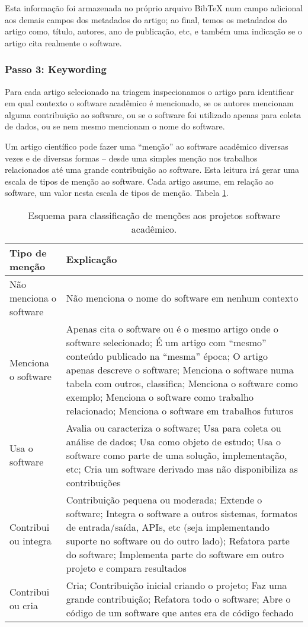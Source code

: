 Esta informação foi armazenada no próprio arquivo BibTeX num campo adicional
aos demais campos dos metadados do artigo; ao final, temos os metadados do
artigo como, título, autores, ano de publicação, etc, e também uma indicação se
o artigo cita realmente o software.

\subsubsection{Passo 3: Keywording}


Para cada artigo selecionado na triagem inspecionamos o artigo para identificar
em qual contexto o software acadêmico é mencionado, se os autores mencionam
alguma contribuição ao software, ou se o software foi utilizado apenas para
coleta de dados, ou se nem mesmo mencionam o nome do software.

Um artigo científico pode fazer uma ``menção'' ao software acadêmico diversas
vezes e de diversas formas -- desde uma simples menção nos trabalhos
relacionados até uma grande contribuição ao software. Esta leitura irá gerar
uma escala de tipos de menção ao software. Cada artigo assume, em relação ao
software, um valor nesta escala de tipos de menção. Tabela
\ref{esquema-de-mencao}.

\begin{table}[h]
\caption{Esquema para classificação de menções aos projetos software acadêmico.}
\centering
\begin{tabular}{ l p{10cm} }
  \hline
  Tipo de menção           & Explicação \\
  \hline
  Não menciona o software  & Não menciona o nome do software em nenhum contexto \\
  Menciona o software      & Apenas cita o software ou é o mesmo artigo onde o software selecionado; É um artigo com ``mesmo'' conteúdo publicado na ``mesma'' época; O artigo apenas descreve o software; Menciona o software numa tabela com outros, classifica; Menciona o software como exemplo; Menciona o software como trabalho relacionado; Menciona o software em trabalhos futuros \\
  Usa o software           & Avalia ou caracteriza o software; Usa para coleta ou análise de dados; Usa como objeto de estudo; Usa o software como parte de uma solução, implementação, etc; Cria um software derivado mas não disponibiliza as contribuições \\
  Contribui ou integra     & Contribuição pequena ou moderada; Extende o software; Integra o software a outros sistemas, formatos de entrada/saída, APIs, etc (seja implementando suporte no software ou do outro lado); Refatora parte do software; Implementa parte do software em outro projeto e compara resultados \\
  Contribui ou cria        & Cria; Contribuição inicial criando o projeto; Faz uma grande contribuição; Refatora todo o software; Abre o código de um software que antes era de código fechado \\
  \hline
\end{tabular}
\label{esquema-de-mencao}
\end{table}

